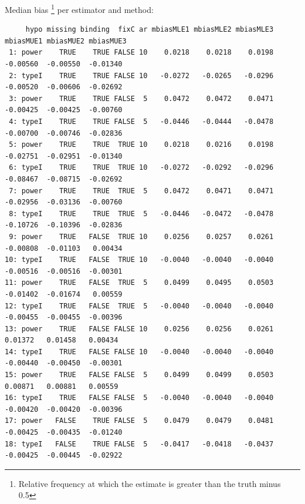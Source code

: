 \documentclass[12pt]{article}
\begin{document}
Median bias \footnote{Relative frequency at which the estimate is greater than the truth minus 0.5} per estimator and method:
\begin{adjustwidth}{-1cm}{-1cm}
\begin{verbatim}
     hypo missing binding  fixC ar mbiasMLE1 mbiasMLE2 mbiasMLE3 mbiasMUE1 mbiasMUE2 mbiasMUE3
 1: power    TRUE    TRUE FALSE 10    0.0218    0.0218    0.0198  -0.00560  -0.00550  -0.01340
 2: typeI    TRUE    TRUE FALSE 10   -0.0272   -0.0265   -0.0296  -0.00520  -0.00606  -0.02692
 3: power    TRUE    TRUE FALSE  5    0.0472    0.0472    0.0471  -0.00425  -0.00425  -0.00760
 4: typeI    TRUE    TRUE FALSE  5   -0.0446   -0.0444   -0.0478  -0.00700  -0.00746  -0.02836
 5: power    TRUE    TRUE  TRUE 10    0.0218    0.0216    0.0198  -0.02751  -0.02951  -0.01340
 6: typeI    TRUE    TRUE  TRUE 10   -0.0272   -0.0292   -0.0296  -0.08467  -0.08715  -0.02692
 7: power    TRUE    TRUE  TRUE  5    0.0472    0.0471    0.0471  -0.02956  -0.03136  -0.00760
 8: typeI    TRUE    TRUE  TRUE  5   -0.0446   -0.0472   -0.0478  -0.10726  -0.10396  -0.02836
 9: power    TRUE   FALSE  TRUE 10    0.0256    0.0257    0.0261  -0.00808  -0.01103   0.00434
10: typeI    TRUE   FALSE  TRUE 10   -0.0040   -0.0040   -0.0040  -0.00516  -0.00516  -0.00301
11: power    TRUE   FALSE  TRUE  5    0.0499    0.0495    0.0503  -0.01402  -0.01674   0.00559
12: typeI    TRUE   FALSE  TRUE  5   -0.0040   -0.0040   -0.0040  -0.00455  -0.00455  -0.00396
13: power    TRUE   FALSE FALSE 10    0.0256    0.0256    0.0261   0.01372   0.01458   0.00434
14: typeI    TRUE   FALSE FALSE 10   -0.0040   -0.0040   -0.0040  -0.00440  -0.00450  -0.00301
15: power    TRUE   FALSE FALSE  5    0.0499    0.0499    0.0503   0.00871   0.00881   0.00559
16: typeI    TRUE   FALSE FALSE  5   -0.0040   -0.0040   -0.0040  -0.00420  -0.00420  -0.00396
17: power   FALSE    TRUE FALSE  5    0.0479    0.0479    0.0481  -0.00425  -0.00435  -0.01240
18: typeI   FALSE    TRUE FALSE  5   -0.0417   -0.0418   -0.0437  -0.00425  -0.00445  -0.02922
\end{verbatim}

\end{adjustwidth}

\clearpage
\end{document}
